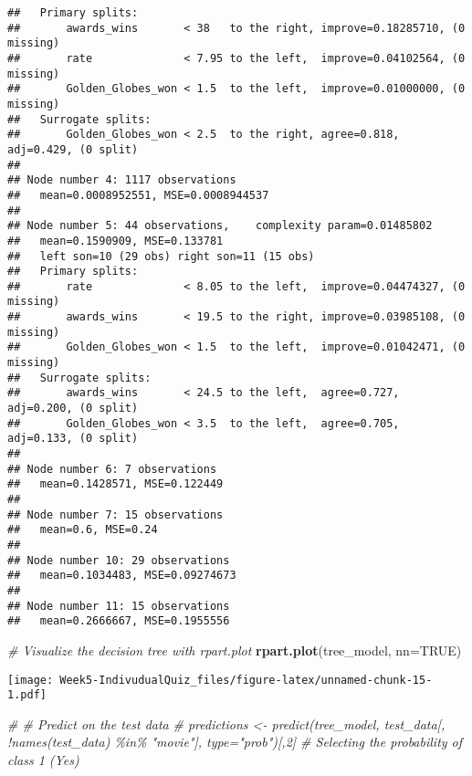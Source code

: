 \documentclass[
]{article}
\newenvironment{Shaded}{\begin{snugshade}}{\end{snugshade}}
\newcommand{\AttributeTok}[1]{\textcolor[rgb]{0.13,0.29,0.53}{#1}}
\newcommand{\CommentTok}[1]{\textcolor[rgb]{0.56,0.35,0.01}{\textit{#1}}}
\newcommand{\ConstantTok}[1]{\textcolor[rgb]{0.56,0.35,0.01}{#1}}
\newcommand{\FunctionTok}[1]{\textcolor[rgb]{0.13,0.29,0.53}{\textbf{#1}}}
\newcommand{\NormalTok}[1]{#1}
\begin{document}
\begin{verbatim}
##   Primary splits:
##       awards_wins       < 38   to the right, improve=0.18285710, (0 missing)
##       rate              < 7.95 to the left,  improve=0.04102564, (0 missing)
##       Golden_Globes_won < 1.5  to the left,  improve=0.01000000, (0 missing)
##   Surrogate splits:
##       Golden_Globes_won < 2.5  to the right, agree=0.818, adj=0.429, (0 split)
## 
## Node number 4: 1117 observations
##   mean=0.0008952551, MSE=0.0008944537 
## 
## Node number 5: 44 observations,    complexity param=0.01485802
##   mean=0.1590909, MSE=0.133781 
##   left son=10 (29 obs) right son=11 (15 obs)
##   Primary splits:
##       rate              < 8.05 to the left,  improve=0.04474327, (0 missing)
##       awards_wins       < 19.5 to the right, improve=0.03985108, (0 missing)
##       Golden_Globes_won < 1.5  to the left,  improve=0.01042471, (0 missing)
##   Surrogate splits:
##       awards_wins       < 24.5 to the left,  agree=0.727, adj=0.200, (0 split)
##       Golden_Globes_won < 3.5  to the left,  agree=0.705, adj=0.133, (0 split)
## 
## Node number 6: 7 observations
##   mean=0.1428571, MSE=0.122449 
## 
## Node number 7: 15 observations
##   mean=0.6, MSE=0.24 
## 
## Node number 10: 29 observations
##   mean=0.1034483, MSE=0.09274673 
## 
## Node number 11: 15 observations
##   mean=0.2666667, MSE=0.1955556
\end{verbatim}

\begin{Shaded}
\begin{Highlighting}[]
\CommentTok{\# Visualize the decision tree with rpart.plot}
\FunctionTok{rpart.plot}\NormalTok{(tree\_model, }\AttributeTok{nn=}\ConstantTok{TRUE}\NormalTok{)}
\end{Highlighting}
\end{Shaded}

\texttt{[image: Week5-IndivudualQuiz\_files/figure-latex/unnamed-chunk-15-1.pdf]}

\begin{Shaded}
\begin{Highlighting}[]
\CommentTok{\# \# Predict on the test data}
\CommentTok{\# predictions \textless{}{-} predict(tree\_model, test\_data[, !names(test\_data) \%in\% "movie"], type="prob")[,2]  \# Selecting the probability of class 1 (Yes)}
\end{Highlighting}
\end{Shaded}
\end{document}

